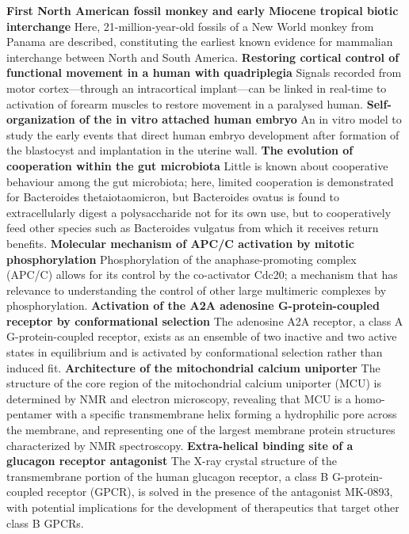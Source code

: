 \documentclass[a4j]{jsarticle}
\begin{document}
\vspace{3mm}
\noindent\textbf{First North American fossil monkey and early Miocene tropical biotic interchange}
Here, 21-million-year-old fossils of a New World monkey from Panama are described, constituting the earliest known evidence for mammalian interchange between North and South America.
\vspace{3mm}
\noindent\textbf{Restoring cortical control of functional movement in a human with quadriplegia}
Signals recorded from motor cortex—through an intracortical implant—can be linked in real-time to activation of forearm muscles to restore movement in a paralysed human.
\vspace{3mm}
\noindent\textbf{Self-organization of the in vitro attached human embryo}
An in vitro model to study the early events that direct human embryo development after formation of the blastocyst and implantation in the uterine wall.
\vspace{3mm}
\noindent\textbf{The evolution of cooperation within the gut microbiota}
Little is known about cooperative behaviour among the gut microbiota; here, limited cooperation is demonstrated for Bacteroides thetaiotaomicron, but Bacteroides ovatus is found to extracellularly digest a polysaccharide not for its own use, but to cooperatively feed other species such as Bacteroides vulgatus from which it receives return benefits.
\vspace{3mm}
\noindent\textbf{Molecular mechanism of APC/C activation by mitotic phosphorylation}
Phosphorylation of the anaphase-promoting complex (APC/C) allows for its control by the co-activator Cdc20; a mechanism that has relevance to understanding the control of other large multimeric complexes by phosphorylation.
\vspace{3mm}
\noindent\textbf{Activation of the A2A adenosine G-protein-coupled receptor by conformational selection}
The adenosine A2A receptor, a class A G-protein-coupled receptor, exists as an ensemble of two inactive and two active states in equilibrium and is activated by conformational selection rather than induced fit.
\vspace{3mm}
\noindent\textbf{Architecture of the mitochondrial calcium uniporter}
The structure of the core region of the mitochondrial calcium uniporter (MCU) is determined by NMR and electron microscopy, revealing that MCU is a homo-pentamer with a specific transmembrane helix forming a hydrophilic pore across the membrane, and representing one of the largest membrane protein structures characterized by NMR spectroscopy.
\vspace{3mm}
\noindent\textbf{Extra-helical binding site of a glucagon receptor antagonist}
The X-ray crystal structure of the transmembrane portion of the human glucagon receptor, a class B G-protein-coupled receptor (GPCR), is solved in the presence of the antagonist MK-0893, with potential implications for the development of therapeutics that target other class B GPCRs.
\vspace{3mm}
\end{document}
